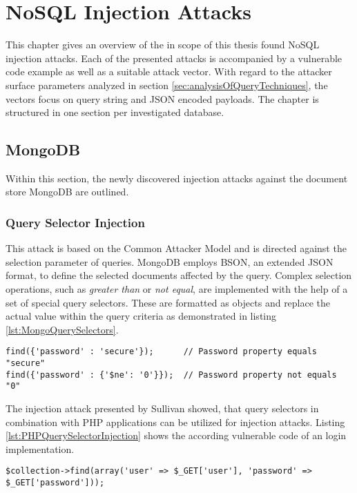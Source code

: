 \chapter{NoSQL Injection Attacks}
This chapter gives an overview of the in scope of this thesis found NoSQL injection attacks. Each of the presented attacks is accompanied by a vulnerable code example as well as a suitable attack vector. With regard to the attacker surface parameters analyzed in section \ref{sec:analysisOfQueryTechniques}, the vectors focus on query string and JSON encoded payloads. The chapter is structured in one section per investigated database.

\section{MongoDB}
Within this section, the newly discovered injection attacks against the document store MongoDB are outlined.

\subsection{Query Selector Injection}
This attack is based on the Common Attacker Model and is directed against the selection parameter of queries. MongoDB employs BSON, an extended JSON format, to define the selected documents affected by the query. Complex selection operations, such as \emph{greater than} or \emph{not equal}, are implemented with the help of a set of special query selectors. These are formatted as objects and replace the actual value within the query criteria as demonstrated in listing \ref{lst:MongoQuerySelectors}. 

\begin{lstlisting}[caption={Example for MongoDB's query selectors}, label={lst:MongoQuerySelectors}]
find({'password' : 'secure'});      // Password property equals "secure"
find({'password' : {'$ne': '0'}});  // Password property not equals "0"
\end{lstlisting}

The injection attack presented by Sullivan \cite{Sullivan:2011} showed, that query selectors in combination with PHP applications can be utilized for injection attacks. Listing \ref{lst:PHPQuerySelectorInjection} shows the according vulnerable code of an login implementation. \\

\begin{lstlisting}[caption={Vulnerable PHP example for query selector injection on MongoDB}, label={lst:PHPQuerySelectorInjection}]
$collection->find(array('user' => $_GET['user'], 'password' => $_GET['password']));
\end{lstlisting}

